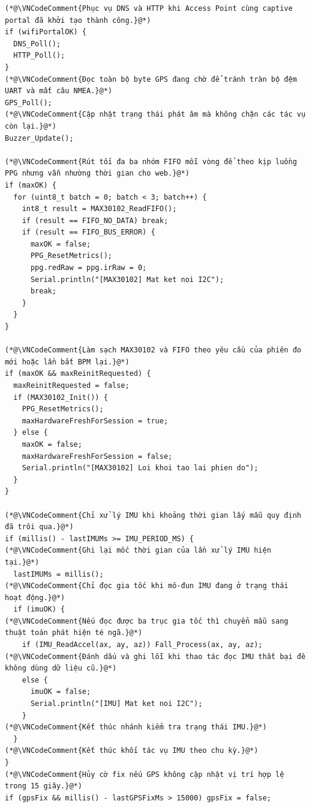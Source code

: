 \documentclass[12pt]{article}
\begin{document}
\Needspace{0.38\textheight}
\begin{lstlisting}[style=firmware,caption={Các tác vụ có chu kỳ độc lập trong vòng lặp chính}]
(*@\VNCodeComment{Phục vụ DNS và HTTP khi Access Point cùng captive portal đã khởi tạo thành công.}@*)
if (wifiPortalOK) {
  DNS_Poll();
  HTTP_Poll();
}
(*@\VNCodeComment{Đọc toàn bộ byte GPS đang chờ để tránh tràn bộ đệm UART và mất câu NMEA.}@*)
GPS_Poll();
(*@\VNCodeComment{Cập nhật trạng thái phát âm mà không chặn các tác vụ còn lại.}@*)
Buzzer_Update();

(*@\VNCodeComment{Rút tối đa ba nhóm FIFO mỗi vòng để theo kịp luồng PPG nhưng vẫn nhường thời gian cho web.}@*)
if (maxOK) {
  for (uint8_t batch = 0; batch < 3; batch++) {
    int8_t result = MAX30102_ReadFIFO();
    if (result == FIFO_NO_DATA) break;
    if (result == FIFO_BUS_ERROR) {
      maxOK = false;
      PPG_ResetMetrics();
      ppg.redRaw = ppg.irRaw = 0;
      Serial.println("[MAX30102] Mat ket noi I2C");
      break;
    }
  }
}

(*@\VNCodeComment{Làm sạch MAX30102 và FIFO theo yêu cầu của phiên đo mới hoặc lần bắt BPM lại.}@*)
if (maxOK && maxReinitRequested) {
  maxReinitRequested = false;
  if (MAX30102_Init()) {
    PPG_ResetMetrics();
    maxHardwareFreshForSession = true;
  } else {
    maxOK = false;
    maxHardwareFreshForSession = false;
    Serial.println("[MAX30102] Loi khoi tao lai phien do");
  }
}

(*@\VNCodeComment{Chỉ xử lý IMU khi khoảng thời gian lấy mẫu quy định đã trôi qua.}@*)
if (millis() - lastIMUMs >= IMU_PERIOD_MS) {
(*@\VNCodeComment{Ghi lại mốc thời gian của lần xử lý IMU hiện tại.}@*)
  lastIMUMs = millis();
(*@\VNCodeComment{Chỉ đọc gia tốc khi mô-đun IMU đang ở trạng thái hoạt động.}@*)
  if (imuOK) {
(*@\VNCodeComment{Nếu đọc được ba trục gia tốc thì chuyển mẫu sang thuật toán phát hiện té ngã.}@*)
    if (IMU_ReadAccel(ax, ay, az)) Fall_Process(ax, ay, az);
(*@\VNCodeComment{Đánh dấu và ghi lỗi khi thao tác đọc IMU thất bại để không dùng dữ liệu cũ.}@*)
    else {
      imuOK = false;
      Serial.println("[IMU] Mat ket noi I2C");
    }
(*@\VNCodeComment{Kết thúc nhánh kiểm tra trạng thái IMU.}@*)
  }
(*@\VNCodeComment{Kết thúc khối tác vụ IMU theo chu kỳ.}@*)
}
(*@\VNCodeComment{Hủy cờ fix nếu GPS không cập nhật vị trí hợp lệ trong 15 giây.}@*)
if (gpsFix && millis() - lastGPSFixMs > 15000) gpsFix = false;


\end{lstlisting}
\end{document}
